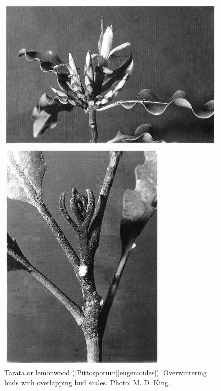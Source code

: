 \begin{figure}[htb]
	\centering
	\begin{minipage}[t]{0.66\textwidth}
		\centering
		\includegraphics[width=\textwidth]{graphics/figure24tarata.jpg}
    	\caption[Tarata or lemonwood]{Tarata or lemonwood ([Pittosporum][eugenioides]). Overwintering buds with overlapping bud scales. Photo: M. D. King.}%
    	\label{fig:24tarata}
	\end{minipage}\hfill%
	\begin{minipage}[t]{0.315\textwidth}
    	\centering
    	\includegraphics[width=\textwidth]{graphics/figure25rewarewa.jpg}

\end{minipage}
\end{figure}
